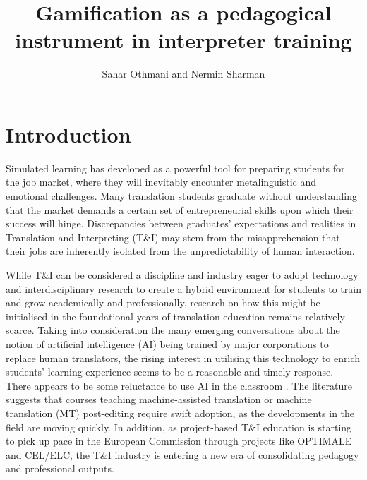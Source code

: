 \documentclass[output=paper]{langscibook}
\author{Sahar Othmani\orcid{}\affiliation{Queen’s University Belfast, United Kingdom} and Nermin Sharman\orcid{}\affiliation{Middle East University, Jordan} }
\title{Gamification as a pedagogical instrument in interpreter training}
\begin{document}
\maketitle 



\section{Introduction}

Simulated learning has developed as a powerful tool for preparing students for the job market, where they will inevitably encounter metalinguistic and emotional challenges.  Many translation students graduate without understanding that the market demands a certain set of entrepreneurial skills upon which their success will hinge. Discrepancies between graduates' expectations and realities in Translation and Interpreting (T\&I) may stem from the misapprehension that their jobs are inherently isolated from the unpredictability of human interaction. 

While T\&I can be considered a discipline and industry eager to adopt technology and interdisciplinary research to create a hybrid environment for students to train and grow academically and professionally, research on how this might be initialised in the foundational years of translation education remains relatively scarce. Taking into consideration the many emerging conversations about the notion of artificial intelligence (AI) being trained by major corporations to replace human translators, the rising interest in utilising this technology to enrich students' learning experience seems to be a reasonable and timely response. There appears to be some reluctance to use AI in the classroom \citep[1]{he2021challenges}. The literature suggests that courses teaching machine-assisted translation or machine translation (MT) post-editing require swift adoption, as the developments in the field are moving quickly. In addition, as project-based T\&I education is starting to pick up pace in the European Commission through projects like OPTIMALE and CEL/ELC, the T\&I industry is entering a new era of consolidating pedagogy and professional outputs.
\end{document}
